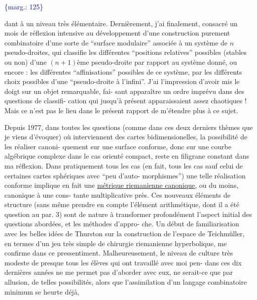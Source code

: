 \documentclass[11pt]{article}
\newcommand{\scanpage}[1]{\par\bigskip\noindent{\small\sffamily[scan #1]}\par}
\newcommand{\mspage}[1]{{\small\sffamily[p.\,#1]}}
\newcommand{\margin}[1]{\textcolor{blue}{\{\textsf{marg.:} #1\}}}
\newcommand{\uline}[1]{\underline{#1}}
\begin{document}
\margin{125}

\clearpage
\scanpage{119/126}
\mspage{48}

dant à un niveau très élémentaire. Dernièrement, j'ai finalement,
consacré un mois de réflexion intensive au développement d'une
construction purement combinatoire d'une sorte de ``surface modulaire''
associée à un système de $n$ pseudo-droites, qui classifie les
différentes ``positions relatives'' possibles (stables ou non) d'une
$(n+1)$ème pseudo-droite par rapport au système donné, ou encore :
les différentes ``affinisations'' possibles de ce système, par les
différents choix possibles d'une ``pseudo-droite à l'infini''. J'ai
l'impression d'avoir mis le doigt sur un objet remarquable, fai-%
sant apparaître un ordre imprévu dans des questions de classifi-%
cation qui jusqu'à présent apparaissaient assez chaotiques !
Mais ce n'est pas le lieu dans le présent rapport de m'étendre plus
à ce sujet.

Depuis 1977, dans toutes les questions (comme dans ces
deux derniers thèmes que je viens d'évoquer) où interviennent des
cartes bidimensionelles, la possibilité de les réaliser canoni-%
quement sur une surface conforme, donc sur une courbe algébrique
complexe dans le cas orienté compact, reste en filigrane constant
dans ma réflexion. Dans pratiquement tous les cas (en fait, tous
les cas sauf celui de certaines cartes sphériques avec ``peu d'auto-%
morphismes'') une telle réalisation conforme implique en fait une
\uline{métrique riemanienne canonique}, ou du moins, canonique à une cons-%
tante multiplicative près. Ces nouveaux éléments de structure
(sans même prendre en compte l'élément arithmétique, dont il a
été question au par. 3) sont de nature à transformer profondément
l'aspect initial des questions abordées, et les méthodes d'appro-%
che. Un début de familiarisation avec les belles idées de Thurston
sur la construction de l'espace de Teichmüller, en termes d'un jeu
très simple de chirurgie riemanienne hyperbolique, me confirme
dans ce pressentiment. Malheureusement, le niveau de culture très
modeste de presque tous les élèves qui ont travaillé avec moi pen-%
dans ces dix dernières années ne me permet pas d'aborder avec eux,
ne serait-ce que par allusion, de telles possibilités, alors que
l'assimilation d'un langage combinatoire minimum se heurte déjà,
\end{document}
